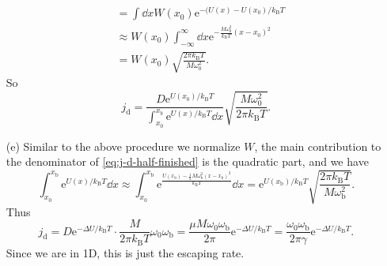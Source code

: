 \documentclass[hyperref, a4paper]{article}
\newcommand*{\ee}{\mathrm{e}}
\begin{document}
\begin{itemize}
\[\begin{aligned}
        &= \int \dd{x} W(x_0) \ee^{- (U(x) - U(x_0) / k_{\text{B}} T} \\
        &\approx W(x_0) \int_{-\infty}^\infty \dd{x} \ee^{- \frac{M \omega_0^2}{k_{\text{B}} T} (x - x_0)^2} \\
        &= W(x_0) \sqrt{\frac{2\pi k_{\text{B}} T}{M \omega_0^2}}.
    \end{aligned}
\]
So 
\begin{equation}
    j_{\text{d}} = \frac{D \ee^{U(x_0) / k_{\text{B}} T} }%
    {\int_{x_0}^{x_b} \ee^{U(x) / k_{\text{B}} T} \dd{x}}
    \sqrt{\frac{M \omega_0^2}{2 \pi k_{\text{B}} T}} .
    \label{eq:j-d-half-finished}
\end{equation}

\item[(e)] Similar to the above procedure we normalize $W$,
the main contribution to the denominator of \eqref{eq:j-d-half-finished} is the quadratic part,
and we have 
\[
    \int_{x_0}^{x_{\text{b}}} \ee^{U(x) / k_{\text{B}} T} \dd{x}
    \approx \int_{x_0}^{x_{\text{b}}} 
    \ee^{ \frac{ U(x_{\text{b}}) - \frac{1}{2} M \omega_\text{b}^2 (x - x_{\text{b}})^2 }{k_{\text{B}} T} } \dd{x} 
    = \ee^{U(x_{\text{b}}) / k_{\text{B}} T} \sqrt{\frac{2\pi k_{\text{B}} T}{M \omega_{\text{b}}^2}}.
\]
Thus 
\begin{equation}
    j_{\text{d}} = D \ee^{- \Delta U / k_{\text{B}} T} \cdot \frac{M}{2\pi k_{\text{B}} T} \omega_0 \omega_{\text{b}} 
    = \frac{\mu M \omega_0 \omega_{\text{b}}}{2\pi} \ee^{- \Delta U / k_{\text{B}} T} = 
    \frac{\omega_0 \omega_{\text{b}}}{2\pi \gamma} \ee^{- \Delta U / k_{\text{B}} T}.
\end{equation}
Since we are in 1D, this is just the escaping rate.


\end{itemize}
\end{document}
